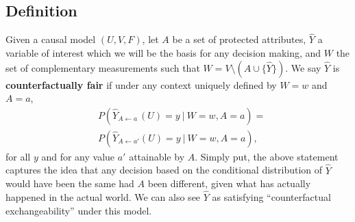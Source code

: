 \begin{figure}[th!]
\end{figure}


\subsection{Definition}
Given a causal model $(U, V, F)$, let $A$ be a set of protected
attributes, $\hat Y$ a variable of interest which we will be the basis for
any decision making, and $W$ the set of complementary measurements such that $W= V \setminus ( A \cup \{\hat Y\})$. We say $\hat Y$ is {\bf
  counterfactually fair} if under any context uniquely defined by $W = w$ and $A = a$,
\begin{align}
  \label{eq:cf_definition}
  &P(\hat Y_{A \leftarrow a\ }(U) = y\ |\ W = w, A = a)  =\nonumber\\ 
  &P(\hat Y_{A \leftarrow a'}(U) = y\ |\ W = w, A = a), 
\end{align}
%
for all $y$ and for any value $a'$ attainable by $A$. Simply put,
the above statement captures the idea that any decision based on the
conditional distribution of $\hat Y$ would have been the same had $A$ been
different, given what has actually happened in the actual world.
We can also see $\hat Y$ as satisfying ``counterfactual exchangeability''
under this model.

